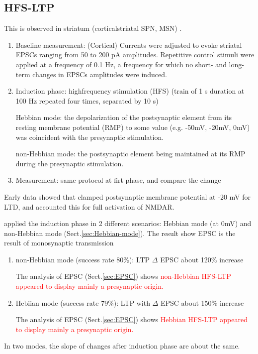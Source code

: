 
\subsection{HFS-LTP}
\label{sec:HFS-LTP}

This is observed in striatum (corticalstriatal SPN, MSN) \citep{fino2005}.

\begin{enumerate} 
  \item Baseline measurement: (Cortical) Currents were adjusted to
evoke striatal EPSCs ranging from 50 to 200 pA amplitudes. Repetitive
control stimuli were applied at a frequency of 0.1 Hz, a frequency for
which no short- and long-term changes in EPSCs amplitudes were induced.
  
  \item Induction phase: highfrequency stimulation (HFS) (train of 1 s duration at 100
Hz repeated four times, separated by 10 s)

Hebbian mode: the depolarization of the postsynaptic element from its resting
membrane potential (RMP) to some value (e.g. -50mV, -20mV, 0mV) was coincident
with the presynaptic stimulation.

non-Hebbian mode: the postsynaptic element being maintained at its RMP during
the presynaptic stimulation.

  \item Measurement: same protocol at firt phase, and compare the change
\end{enumerate}

Early data showed that clamped postsynaptic membrane potential at -20 mV for
LTD, and accounted this for full activation of NMDAR.

\citep{fino2005} applied the induction phase in 2 different scenarios:
Hebbian mode (at 0mV) and non-Hebbian mode (Sect.\ref{sec:Hebbian-mode}). The
result show EPSC is the result of monosynaptic transmission
\begin{enumerate}
  \item non-Hebbian mode (success rate 80\%): LTP $\Delta$ EPSC about 120\%
  increase
  
  The analysis of EPSC (Sect.\ref{sec:EPSC}) shows 
  \textcolor{red}{non-Hebbian HFS-LTP appeared
  to display mainly a presynaptic origin.}
  
  \item Hebiian mode (success rate 79\%): LTP with $\Delta $ EPSC about 150\%
  increase
  
  The analysis of EPSC (Sect.\ref{sec:EPSC}) shows 
  \textcolor{red}{Hebbian HFS-LTP appeared
  to display mainly a presynaptic origin.}
  
\end{enumerate}
In two modes, the slope of changes after induction phase are about the same.

